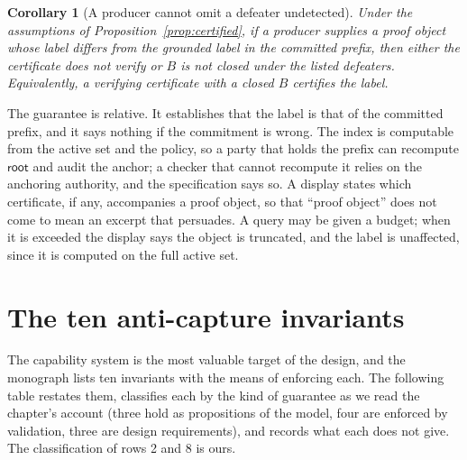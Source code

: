 \documentclass[11pt]{article}
\theoremstyle{plain}
\newtheorem{corollary}[theorem]{Corollary}
\theoremstyle{definition}
\theoremstyle{remark}
\begin{document}
\begin{corollary}[A producer cannot omit a defeater undetected]\label{cor:noomit}
Under the assumptions of Proposition~\ref{prop:certified}, if a producer supplies a proof object whose label differs from the grounded label in the committed prefix, then either the certificate does not verify or $B$ is not closed under the listed defeaters. Equivalently, a verifying certificate with a closed $B$ certifies the label.
\end{corollary}

The guarantee is relative. It establishes that the label is that of the committed prefix, and it says nothing if the commitment is wrong. The index is computable from the active set and the policy, so a party that holds the prefix can recompute $\mathsf{root}$ and audit the anchor; a checker that cannot recompute it relies on the anchoring authority, and the specification says so. A display states which certificate, if any, accompanies a proof object, so that ``proof object'' does not come to mean an excerpt that persuades. A query may be given a budget; when it is exceeded the display says the object is truncated, and the label is unaffected, since it is computed on the full active set.

\section{The ten anti-capture invariants}\label{sec:invariants}

The capability system is the most valuable target of the design, and the monograph lists ten invariants with the means of enforcing each. The following table restates them, classifies each by the kind of guarantee as we read the chapter's account (three hold as propositions of the model, four are enforced by validation, three are design requirements), and records what each does not give. The classification of rows 2 and 8 is ours.
\end{document}
